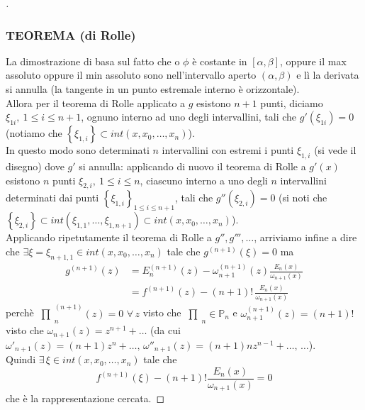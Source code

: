 \documentclass[12pt]{article}
\newcommand{\inter}{\begin{matrix}\prod\end{matrix}}
\begin{document}
\begin{proof}[\unskip\nopunct]
\subsubsection{TEOREMA (di Rolle)}
\begin{center}
\end{center}
La dimostrazione di basa sul fatto che o $\phi$ è costante in $[\alpha,\beta]$, oppure il max assoluto oppure il min assoluto sono nell'intervallo aperto $(\alpha,\beta)$ e lì la derivata si annulla (la tangente in un punto estremale interno è orizzontale). \\
Allora per il teorema di Rolle applicato a $g$ esistono $n+1$ punti, diciamo $\xi_{1i}, \ 1 \leq i \leq n+1$, ognuno interno ad uno degli intervallini, tali che $g'(\xi_{1i})=0$ (notiamo che $\left\{ \xi_{1,i} \right\} \subset int(x,x_0,\dots,x_n)$). \\
In questo modo sono determinati $n$ intervallini con estremi i punti $\xi_{1,i}$ (si vede il disegno) dove $g'$ si annulla: applicando di nuovo il teorema di Rolle a $g'(x)$ esistono $n$ punti $\xi_{2,i}, \ 1 \leq i \leq n$, ciascuno interno a uno degli $n$ intervallini determinati dai punti $\left\{ \xi_{1,i} \right\}_{1 \leq i \leq n+1}$, tali che $g''(\xi_{2,i}) = 0$ (si noti che $\left\{ \xi_{2,i} \right\} \subset int(\xi_{1,1},\dots, \xi_{1,n+1}) \subset int(x,x_0,\dots,x_n)$). \\
Applicando ripetutamente il teorema di Rolle a $g'',g''',\dotso$, arriviamo infine a dire che $\exists \xi = \xi_{n+1,1} \in int(x,x_0,\dots,x_n)$ tale che $g^{(n+1)}(\xi) = 0$ ma
\[\begin{split}
    g^{(n+1)}(z) & = E_n^{(n+1)}(z) - \omega_{n+1}^{(n+1)}(z) \frac{E_n(x)}{\omega_{n+1}(x)} \\
    & = f^{(n+1)}(z) - (n+1)!\, \frac{E_n(x)}{\omega_{n+1}(x)}
\end{split}\]
perchè $\inter_n^{(n+1)}(z) = 0 \,\,\forall\,z$ visto che $\inter_n \in \mathbb{P}_n$ e $\omega_{n+1}^{(n+1)}(z) = (n+1)!$ visto che $\omega_{n+1}(z) = z^{n+1} + \dotso$ (da cui $\omega'_{n+1}(z) = (n+1)z^n + \dotso,\, \omega''_{n+1}(z) = (n+1)nz^{n-1} + \dotso,\,\dotso$).\\
Quindi $\exists \, \xi \in int(x,x_0,\dotso,x_n)$ tale che
\[f^{(n+1)}(\xi) - (n+1)!\frac{E_n(x)}{\omega_{n+1}(x)} = 0\]
che è la rappresentazione cercata.
\end{proof}
\end{document}
